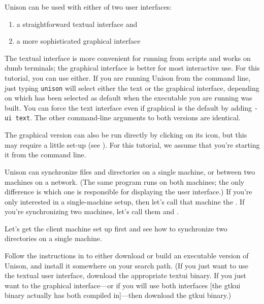 \documentclass{article}
\begin{document}



Unison can be used with either of two user interfaces: 
\begin{enumerate}
\item a straightforward textual interface and 
\item a more sophisticated graphical interface
\end{enumerate}
The textual interface is more convenient for running from scripts and
works on dumb terminals; the graphical interface is better for most
interactive use.  For this tutorial, you can use either.  If you are running
Unison from the command line, just typing {\tt unison} 
will select either the text or the graphical interface, depending on which
has been selected as default when the executable you are running was
built.  You can force the text interface even if graphical is the default by
adding {\tt -ui text}.  
The other command-line arguments to both versions are identical.  

The graphical version can also be run directly by clicking on its icon, but
this may require a little set-up (see ).  For this tutorial, we assume that you're starting it from the
command line.

Unison can synchronize files and directories on a single machine, or
between two machines on a network.  (The same program runs on both
machines; the only difference is which one is responsible for
displaying the user interface.)  If you're only interested in a
single-machine setup, then let's call that machine the \CLIENT{}.  If
you're synchronizing two machines, let's call them \CLIENT{} and
\SERVER.


Let's get the client machine set up first and see how to synchronize
two directories on a single machine.

Follow the instructions in  to either
download or build an executable version of Unison, and install it
somewhere on your search path.  (If you just want to use the textual user
interface, download the appropriate textui binary.  If you just want to
the graphical interface---or if you will use both interfaces [the gtkui
binary actually has both compiled in]---then download the gtkui binary.)
\end{document}
